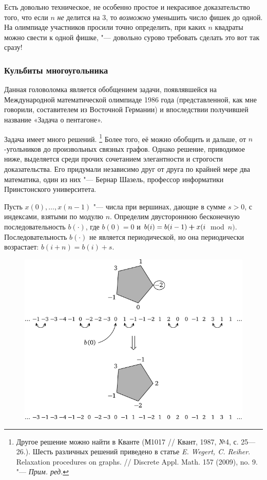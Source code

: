 \documentclass[twoside]{book}
\begin{document}
Есть довольно техническое, не особенно простое и некрасивое 
доказательство того, что если $n$ \emph{не} делится на $3$, то \emph{возможно} уменьшить число фишек до одной.
На олимпиаде участников просили точно определить, при каких $n$ квадраты можно свести к одной фишке, "--- довольно сурово требовать сделать это вот так сразу!

\subsubsection*{Кульбиты многоугольника}%

Данная головоломка является обобщением задачи, появлявшейся на Международной математической олимпиаде 1986 года (представленной, как мне говорили, составителем из Восточной Германии) и впоследствии получившей название «Задача о пентагоне».

Задача имеет много решений.
\footnote{Другое решение можно найти в Кванте (М1017 /\!/ Квант, 1987, №4, с. 25---26.).
Шесть различных решений приведено в статье \emph{E. Wegert, C. Reiher}. Relaxation procedures on graphs. /\!/ Discrete Appl. Math. 157 (2009), no. 9. "--- \emph{Прим. ред.}}
Более того, её можно обобщить и дальше, от $n$-угольников до произвольных связных графов.
Однако решение, приводимое ниже, выделяется среди прочих сочетанием элегантности и строгости доказательства.
Его придумали независимо друг от друга по крайней мере два математика, один из них "--- Бернар Шазель, профессор информатики Принстонского университета. %

\medskip

Пусть $x(0),\dots,x(n-1)$ "--- числа при вершинах, дающие в сумме $s > 0$, с индексами, взятыми по модулю $n$.
Определим двустороннюю бесконечную последовательность
$b(\cdot)$, где $b(0) = 0$ и $b(i) = b(i -1) \hm+ x(i$~mod~${n})$.
Последовательность $b(\cdot)$ не является периодической, но она периодически возрастает: $b(i + n) = b(i) + s$.

\begin{figure}
\centering
\includegraphics{mp/wink-200}
\end{figure}
\end{document}
